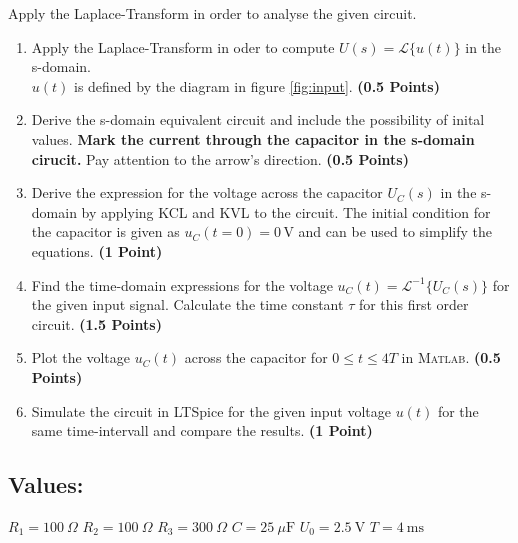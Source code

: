 \documentclass[a4paper]{article}
\begin{document}
	Apply the Laplace-Transform in order to analyse the given circuit.
	\begin{enumerate}
		\item Apply the Laplace-Transform in oder to compute $U(s) = \mathcal{L}\{u(t)\}$ in the s-domain. \\
		$u(t)$ is defined by the diagram in figure \ref{fig:input}. \textbf{(0.5 Points)}
		
		\item Derive the s-domain equivalent circuit and include the possibility of inital values. \textbf{Mark the current through the capacitor in the s-domain cirucit.} Pay attention to the arrow's direction. \textbf{(0.5 Points)}
		
		\item Derive the expression for the voltage across the capacitor $U_C(s)$ in the s-domain by applying KCL and KVL to the circuit. The initial condition for the capacitor is given as $u_C(t=0) = 0\,\text{V}$ and can be used to simplify the equations. \textbf{(1 Point)}

		\item Find the time-domain expressions for the voltage $u_C(t) = \mathcal{L}^{-1}\{U_C(s)\}$ for the given input signal. Calculate the time constant $\tau$ for this first order circuit. \textbf{(1.5 Points)}

		\item Plot the voltage $u_C(t)$ across the capacitor for $0 \leq t \leq 4T$ in \textsc{Matlab}. \textbf{(0.5 Points)}
		
		\item Simulate the circuit in LTSpice for the given input voltage $u(t)$ for the same time-intervall and compare the results. \textbf{(1 Point)}
	\end{enumerate}
		

	\subsection*{Values:}
	$R_1 = 100~\Omega$ \qquad $R_2 = 100~\Omega$ \qquad $R_3 = 300~\Omega$ \qquad $C=25~\mu\text{F}$ \qquad $U_0 = 2.5~\text{V}$ \qquad $T = 4~\text{ms}$\\
	
\end{document}
